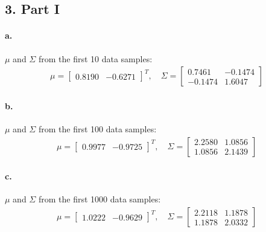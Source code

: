 \documentclass[a4paper]{article}
\begin{document}
\setcounter{page}{3}

\subsection*{3. Part I}

\paragraph{a.} $\mu$ and $\Sigma$ from the first 10 data samples: \\
\begin{align*}
	\mu = \begin{bmatrix}
		0.8190 & -0.6271
	\end{bmatrix}^{T}, \quad
	\Sigma = \begin{bmatrix}
		 0.7461  &  -0.1474 \\
		-0.1474  &   1.6047
	\end{bmatrix}
\end{align*}

\paragraph{b.} $\mu$ and $\Sigma$ from the first 100 data samples: \\
\begin{align*}
	\mu = \begin{bmatrix}
		0.9977 & -0.9725
	\end{bmatrix}^{T}, \quad
	\Sigma = \begin{bmatrix}
		2.2580  &  1.0856 \\
		1.0856  &  2.1439
	\end{bmatrix}
\end{align*}

\paragraph{c.} $\mu$ and $\Sigma$ from the first 1000 data samples: \\
\begin{align*}
	\mu = \begin{bmatrix}
		1.0222 & -0.9629
	\end{bmatrix}^{T}, \quad
	\Sigma = \begin{bmatrix}
		2.2118  &  1.1878 \\
		1.1878  &  2.0332
	\end{bmatrix}
\end{align*}
\end{document}
